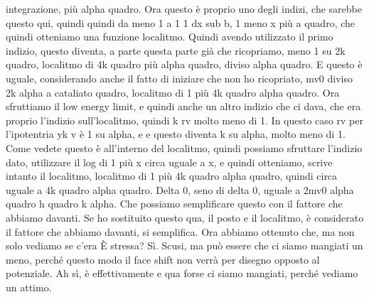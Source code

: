 {\begin{soluzione}
integrazione, più alpha quadro. Ora questo è proprio uno degli indizi, che sarebbe questo qui, quindi quindi da meno 1 a 1 1 dx sub b, 1 meno x più a quadro, che quindi otteniamo una funzione localitmo. Quindi avendo utilizzato il primo indizio, questo diventa, a parte questa parte già che ricopriamo, meno 1 su 2k quadro, localitmo di 4k quadro più alpha quadro, diviso alpha quadro. E questo è uguale, considerando anche il fatto di iniziare che non ho ricopriato, mv0 diviso 2k alpha a cataliato quadro, localitmo di 1 più 4k quadro alpha quadro. Ora sfruttiamo il low energy limit, e quindi anche un altro indizio che ci dava, che era proprio l'indizio sull'localitmo, quindi k rv molto meno di 1. In questo caso rv per l'ipotentria yk v è 1 su alpha, e e questo diventa k su alpha, molto meno di 1. Come vedete questo è all'interno del localitmo, quindi possiamo sfruttare l'indizio dato, utilizzare il log di 1 più x circa uguale a x, e quindi otteniamo, scrive intanto il localitmo, localitmo di 1 più 4k quadro alpha quadro, quindi circa uguale a 4k quadro alpha quadro. Delta 0, seno di delta 0, uguale a 2mv0 alpha quadro h quadro k alpha. Che possiamo semplificare questo con il fattore che abbiamo davanti. Se ho sostituito questo qua, il posto e il localitmo, è considerato il fattore che abbiamo davanti, si semplifica. Ora abbiamo ottenuto che, ma non solo vediamo se c'era È stressa? Sì. Scusi, ma può essere che ci siamo mangiati un meno, perché questo modo il face shift non verrà per disegno opposto al potenziale. Ah sì, è effettivamente e qua forse ci siamo mangiati, perché vediamo un attimo. 
   

\end{soluzione}}
